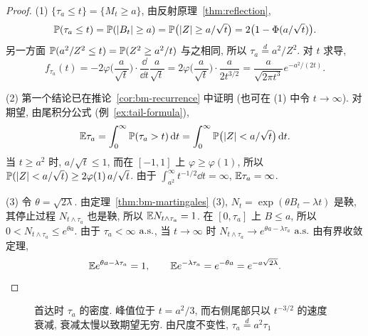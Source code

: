 \begin{proof}
(1) $\{\tau_a\le t\}=\{M_t\ge a\}$, 由反射原理~\ref{thm:reflection},
\[
\P(\tau_a\le t)=\P(\abs{B_t}\ge a)=\P\big(\abs{Z}\ge a/\sqrt{t}\big)=2\big(1-\Phi(a/\sqrt{t})\big).
\]
另一方面 $\P(a^2/Z^2\le t)=\P(Z^2\ge a^2/t)$ 与之相同, 所以 $\tau_a\overset{d}{=}a^2/Z^2$. 对 $t$ 求导,
\[
f_{\tau_a}(t)=-2\varphi\Big(\frac{a}{\sqrt{t}}\Big)\cdot\frac{\dd}{\dd t}\frac{a}{\sqrt{t}}=2\varphi\Big(\frac{a}{\sqrt{t}}\Big)\cdot\frac{a}{2t^{3/2}}=\frac{a}{\sqrt{2\pi t^3}}e^{-a^2/(2t)}.
\]

(2) 第一个结论已在推论~\ref{cor:bm-recurrence} 中证明 (也可在 (1) 中令 $t\to\infty$). 对期望, 由尾积分公式 (例~\ref{ex:tail-formula}),
\[
\E\tau_a=\int_0^\infty\P(\tau_a>t)\dd t=\int_0^\infty\P\big(\abs{Z}<a/\sqrt{t}\big)\dd t.
\]
当 $t\ge a^2$ 时, $a/\sqrt{t}\le1$, 而在 $[-1,1]$ 上 $\varphi\ge\varphi(1)$, 所以 $\P(\abs{Z}<a/\sqrt{t})\ge2\varphi(1)\,a/\sqrt{t}$. 由于 $\int_{a^2}^\infty t^{-1/2}\dd t=\infty$, $\E\tau_a=\infty$.

(3) 令 $\theta=\sqrt{2\lambda}$. 由定理~\ref{thm:bm-martingales} (3), $N_t=\exp(\theta B_t-\lambda t)$ 是鞅, 其停止过程 $N_{t\wedge\tau_a}$ 也是鞅, 所以 $\E N_{t\wedge\tau_a}=1$. 在 $[0,\tau_a]$ 上 $B\le a$, 所以 $0<N_{t\wedge\tau_a}\le e^{\theta a}$. 由于 $\tau_a<\infty$ $\as$, 当 $t\to\infty$ 时 $N_{t\wedge\tau_a}\to e^{\theta a-\lambda\tau_a}$ $\as$ 由有界收敛定理,
\[
\E e^{\theta a-\lambda\tau_a}=1,\qquad\E e^{-\lambda\tau_a}=e^{-\theta a}=e^{-a\sqrt{2\lambda}}.\qedhere
\]
\end{proof}

\begin{figure}[htbp]
\centering
{}
\caption{首达时 $\tau_a$ 的密度. 峰值位于 $t=a^2/3$, 而右侧尾部只以 $t^{-3/2}$ 的速度衰减, 衰减太慢以致期望无穷. 由尺度不变性, $\tau_a\overset{d}{=}a^2\tau_1$}
\label{fig:hitting-density}
\end{figure}

